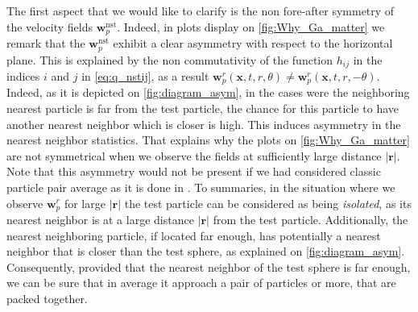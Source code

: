 The first aspect that we would like to clarify is the non fore-after symmetry of the velocity fields $\textbf{w}_p^\text{nst}$. 
Indeed, in plots display on \ref{fig:Why_Ga_matter} we remark that the $\textbf{w}_p^\text{nst}$ exhibit a clear asymmetry with respect to the horizontal plane.
This is explained by the non commutativity of the function $h_{ij}$ in the indices $i$ and $j$ in \ref{eq:q_nstij}, as a result $\textbf{w}_p^r(\textbf{x},t,r,\theta) \neq \textbf{w}_p^r(\textbf{x},t,r,-\theta)$. 
Indeed, as it is depicted on \ref{fig:diagram_asym}, in the cases were the neighboring nearest particle is far from the test particle, the chance for this particle to have another nearest neighbor which is closer is high. 
This induces asymmetry in the nearest neighbor statistics. 
That explains why the plots on \ref{fig:Why_Ga_matter} are not symmetrical when we observe the fields at sufficiently large distance $|\textbf{r}|$. 
Note that this asymmetry would not be present if we had considered classic particle pair average as it is done in \cite{shajahan2023inertial}. 
To summaries, in the situation where we observe $\textbf{w}_p^r$ for large $|\textbf{r}|$ the test particle can be considered as being \textit{isolated}, as its nearest neighbor is at a large distance $|\textbf{r}|$ from the test particle. 
Additionally, the nearest neighboring particle, if located far enough, has 
potentially a nearest neighbor that is closer than the test sphere, as explained on \ref{fig:diagram_asym}. 
Consequently, provided that the nearest neighbor of the test sphere is far enough, we can be sure that in average it approach a pair of particles or more, that are packed together. 

